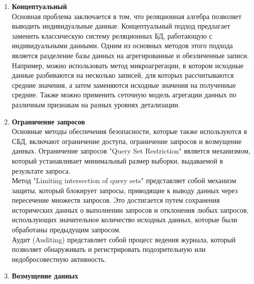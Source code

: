 \begin{enumerate}
    \item \textbf{Концептуальный}
    \\

    Основная проблема заключается в том, что реляционная алгебра позволяет выводить индивидуальные данные. Концептуальный подход предлагает заменить классическую систему реляционных БД, работающую с индивидуальными данными. Одним из основных методов этого подхода является разделение базы данных на агрегированные и обезличенные записи. Например, можно использовать метод микроагрегации, в котором исходные данные разбиваются на несколько записей, для которых рассчитываются средние значения, а затем заменяются исходные значения на полученные средние. Также можно применить сеточную модель агрегации данных по различным признакам на разных уровнях детализации.

    \item \textbf{Ограничение запросов}
    \\

    Основные методы обеспечения безопасности, которые также используются в СБД, включают ограничение доступа, ограничение запросов и возмущение данных. Ограничение запросов "Query Set Restriction" является механизмом, который устанавливает минимальный размер выборки, выдаваемой в результате запроса.
    \\
    
	Метод "Limiting intersection of query sets" представляет собой механизм защиты, который блокирует запросы, приводящие к выводу данных через пересечение множеств запросов. Это достигается путем сохранения исторических данных о выполнении запросов и отклонения любых запросов, использующих значительное количество исходных данных, которые были обработаны предыдущим запросом.
    \\
    
	Аудит (Auditing) представляет собой процесс ведения журнала, который позволяет обнаруживать и регистрировать подозрительную или недобросовестную активность.

    \item \textbf{Возмущение данных}
    \\


\end{enumerate}
